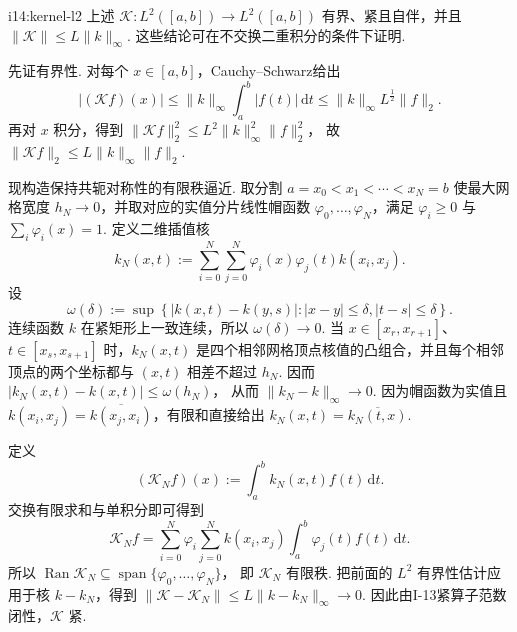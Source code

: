 \begin{FAProposition}{i14:kernel-l2}
上述 \(\displaystyle \mathcal K:L^2([a,b])\to L^2([a,b])\) 有界、紧且自伴，并且
\(\displaystyle \|\mathcal K\| \leqslant L\|k\|_\infty\).
这些结论可在不交换二重积分的条件下证明.
\end{FAProposition}

\begin{FAProof}
先证有界性. 对每个 \(\displaystyle x\in[a,b]\)，Cauchy--Schwarz给出
\[
|(\mathcal Kf)(x)| \leqslant \|k\|_\infty\int_a^b|f(t)|\,\mathrm{d}t \leqslant \|k\|_\infty L^{\frac{1}{2}}\|f\|_2.
\]
再对 \(\displaystyle x\) 积分，得到
\(\displaystyle \|\mathcal Kf\|_2^2 \leqslant L^2\|k\|_\infty^2\|f\|_2^2\)，
故 \(\displaystyle \|\mathcal Kf\|_2\leqslant L\|k\|_\infty\|f\|_2\).

现构造保持共轭对称性的有限秩逼近. 取分割
\(\displaystyle a=x_0<x_1<\cdots<x_N=b\)
使最大网格宽度 \(\displaystyle h_N\to0\)，并取对应的实值分片线性帽函数 \(\displaystyle \varphi_0,\dots,\varphi_N\)，满足 \(\displaystyle \varphi_i\geqslant0\) 与 \(\displaystyle \sum_i\varphi_i(x)=1\). 定义二维插值核
\[
k_N(x,t)
:=
\sum_{i=0}^{N}\sum_{j=0}^{N}
\varphi_i(x)\varphi_j(t)k(x_i,x_j).
\]
设
\[
\omega(\delta)
:=
\sup\left\{
|k(x,t)-k(y,s)|:
|x-y|\leqslant\delta,
|t-s|\leqslant\delta
\right\}.
\]
连续函数 \(\displaystyle k\) 在紧矩形上一致连续，所以 \(\displaystyle \omega(\delta)\to0\). 当 \(\displaystyle x\in[x_r,x_{r+1}]\)、\(\displaystyle t\in[x_s,x_{s+1}]\) 时，\(\displaystyle k_N(x,t)\) 是四个相邻网格顶点核值的凸组合，并且每个相邻顶点的两个坐标都与 \(\displaystyle (x,t)\) 相差不超过 \(\displaystyle h_N\). 因而
\(\displaystyle |k_N(x,t)-k(x,t)| \leqslant \omega(h_N)\)，
从而
\(\displaystyle \|k_N-k\|_\infty \to0\).
因为帽函数为实值且 \(\displaystyle k(x_i,x_j)=\overline{k(x_j,x_i)}\)，有限和直接给出
\(\displaystyle k_N(x,t) = \overline{k_N(t,x)}\).

定义
\[
(\mathcal K_Nf)(x)
:=
\int_a^b k_N(x,t)f(t)\,\mathrm{d}t.
\]
交换有限求和与单积分即可得到
\[
\mathcal K_Nf
=
\sum_{i=0}^{N}
\varphi_i
\sum_{j=0}^{N}
k(x_i,x_j)
\int_a^b\varphi_j(t)f(t)\,\mathrm{d}t.
\]
所以
\(\displaystyle \operatorname{Ran}\mathcal K_N \subseteq \operatorname{span}\{\varphi_0,\dots,\varphi_N\}\)，
即 \(\displaystyle \mathcal K_N\) 有限秩. 把前面的 \(\displaystyle L^2\) 有界性估计应用于核 \(\displaystyle k-k_N\)，得到
\(\displaystyle \|\mathcal K-\mathcal K_N\| \leqslant L\|k-k_N\|_\infty \to0\).
因此由I-13紧算子范数闭性，\(\displaystyle \mathcal K\) 紧.


\end{FAProof}
